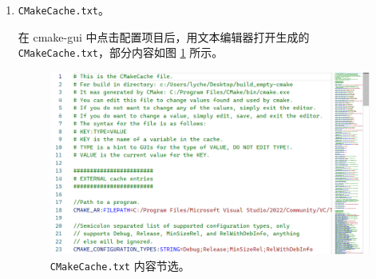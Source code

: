 \begin{enumerate}
	\item \lstinline[language={}]{CMakeCache.txt}。

	在 cmake-gui 中点击配置项目后，用文本编辑器打开生成的 \lstinline[language={}]{CMakeCache.txt}，部分内容如图 \ref{fig:cmake-cache} 所示。

	\begin{figure}[H]
		\centering
		\includegraphics[width=0.8\linewidth]{assets/cmake-cache}
		\caption{\lstinline[language={}]{CMakeCache.txt} 内容节选。}
		\label{fig:cmake-cache}
	\end{figure}
\end{enumerate}
